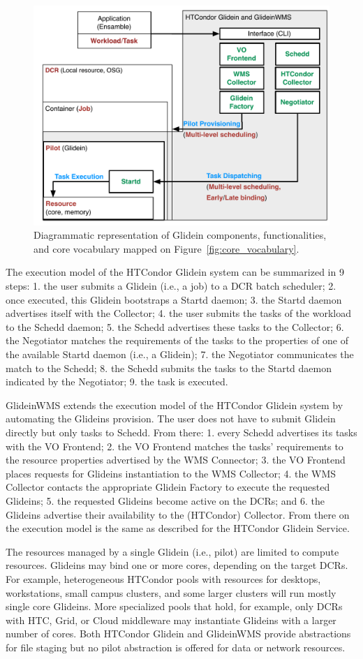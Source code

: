 \documentclass{sig-alternate}
\begin{document}
\begin{figure}[t]
    \centering
        \includegraphics[width=.48\textwidth]{figures/glidein_comparison.pdf}
        \caption{Diagrammatic representation of Glidein components,
          functionalities, and core vocabulary mapped on
          Figure~\ref{fig:core_vocabulary}.}
    \label{fig:glidein_comparison}
\end{figure}

The execution model of the HTCondor Glidein system can be summarized in 9 steps:
1. the user submits a Glidein (i.e., a job) to a DCR batch scheduler; 2. once
executed, this Glidein bootstraps a Startd daemon; 3. the Startd daemon
advertises itself with the Collector; 4. the user submits the tasks of the
workload to the Schedd daemon; 5. the Schedd advertises these tasks to the
Collector; 6. the Negotiator matches the requirements of the tasks to the
properties of one of the available Startd daemon (i.e., a Glidein); 7. the
Negotiator communicates the match to the Schedd; 8. the Schedd submits the tasks
to the Startd daemon indicated by the Negotiator; 9. the task is executed.

GlideinWMS extends the execution model of the HTCondor Glidein system by
automating the Glideins provision. The user does not have to submit Glidein
directly but only tasks to Schedd. From there: 1. every Schedd advertises its
tasks with the VO Frontend; 2. the VO Frontend matches the tasks' requirements
to the resource properties advertised by the WMS Connector; 3. the VO Frontend
places requests for Glideins instantiation to the WMS Collector; 4. the WMS
Collector contacts the appropriate Glidein Factory to execute the requested
Glideins; 5. the requested Glideins become active on the DCRs; and 6. the
Glideins advertise their availability to the (HTCondor) Collector. From there on
the execution model is the same as described for the HTCondor Glidein Service.


The resources managed by a single Glidein (i.e., pilot) are limited to compute
resources. Glideins may bind one or more cores, depending on the target DCRs.
For example, heterogeneous HTCondor pools with resources for desktops,
workstations, small campus clusters, and some larger clusters will run mostly
single core Glideins. More specialized pools that hold, for example, only DCRs
with HTC, Grid, or Cloud middleware may instantiate Glideins with a larger
number of cores. Both HTCondor Glidein and GlideinWMS provide abstractions for
file staging but no pilot abstraction is offered for data or network resources.
\end{document}
